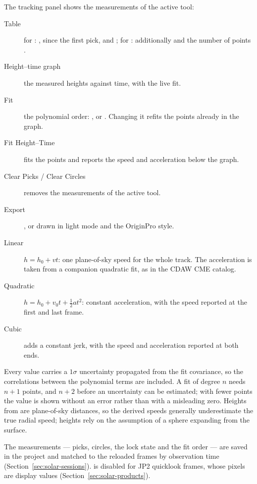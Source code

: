 The tracking panel shows the measurements of the active tool:
\begin{description}
  \item[Table] for : ,  since the first pick,
     and ; for : additionally 
    and the number of points .
  \item[Height--time graph] the measured heights against time, with the live fit.
  \item[Fit] the polynomial order: ,  or . Changing it
    refits the points already in the graph.
  \item[Fit Height–Time] fits the points and reports the speed and acceleration below the
    graph.
  \item[Clear Picks / Clear Circles] removes the measurements of the active tool.
  \item[Export] , or  drawn in
    light mode and the OriginPro style.
\end{description}

\begin{background}
  \begin{description}
    \item[Linear] \(h = h_0 + v t\): one plane-of-sky speed for the whole track. The
      acceleration is taken from a companion quadratic fit, as in the CDAW CME catalog.
    \item[Quadratic] \(h = h_0 + v_0 t + \tfrac12 a t^2\): constant acceleration, with the
      speed reported at the first and last frame.
    \item[Cubic] adds a constant jerk, with the speed and acceleration reported at both ends.
  \end{description}
  Every value carries a \(1\sigma\) uncertainty propagated from the fit covariance, so the
  correlations between the polynomial terms are included. A fit of degree \(n\) needs \(n+1\)
  points, and \(n+2\) before an uncertainty can be estimated; with fewer points the value is
  shown without an error rather than with a misleading zero. Heights from  are
  plane-of-sky distances, so the derived speeds generally underestimate the true radial
  speed;  heights rely on the assumption of a sphere expanding from the
  surface.
\end{background}

The measurements --- picks, circles, the lock state and the fit order --- are saved in the
project and matched to the reloaded frames by observation time
(Section~\ref{sec:solar-sessions}).  is disabled for JP2 quicklook frames,
whose pixels are display values (Section~\ref{sec:solar-products}).
